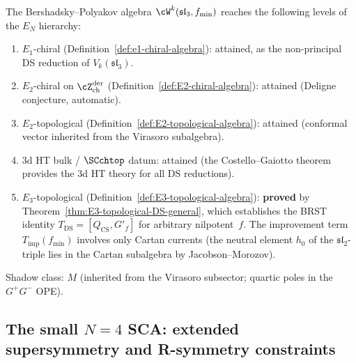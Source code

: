\begin{remark}
\label{rem:bp-EN-level}
The Bershadsky--Polyakov algebra $\cW^k(\mathfrak{sl}_3, f_{\min})$
reaches the following levels of the $E_N$ hierarchy:
\begin{enumerate}[label=\textup{(\roman*)}]
\item $E_1$-chiral
 (Definition~\ref{def:e1-chiral-algebra}): attained, as
 the non-principal DS reduction of $V_k(\mathfrak{sl}_3)$.
\item $E_2$-chiral on $\cZ^{\mathrm{der}}_{\mathrm{ch}}$
 (Definition~\ref{def:E2-chiral-algebra}): attained
 (Deligne conjecture, automatic).
\item $E_2$-topological
 (Definition~\ref{def:E2-topological-algebra}): attained
 (conformal vector inherited from the Virasoro subalgebra).
\item 3d HT bulk / $\SCchtop$ datum: attained
 (the Costello--Gaiotto theorem provides the 3d HT theory for all
 DS reductions).
\item $E_3$-topological
 (Definition~\ref{def:E3-topological-algebra}): \textbf{proved}
 by Theorem~\ref{thm:E3-topological-DS-general}, which
 establishes the BRST identity $T_{\mathrm{DS}} = [Q_{\mathrm{CS}}, G'_f]$
 for arbitrary nilpotent~$f$.
 The improvement term $T_{\mathrm{imp}}(f_{\min})$ involves
 only Cartan currents (the neutral element $h_0$ of the
 $\mathfrak{sl}_2$-triple lies in the Cartan subalgebra
 by Jacobson--Morozov).
\end{enumerate}
Shadow class: $M$ (inherited from the Virasoro subsector;
quartic poles in the $G^+G^-$ OPE).
\end{remark}


%
%

\subsection{The small \texorpdfstring{$N{=}4$}{N=4} SCA: extended
 supersymmetry and R-symmetry constraints}
\label{subsec:n4-sca}

